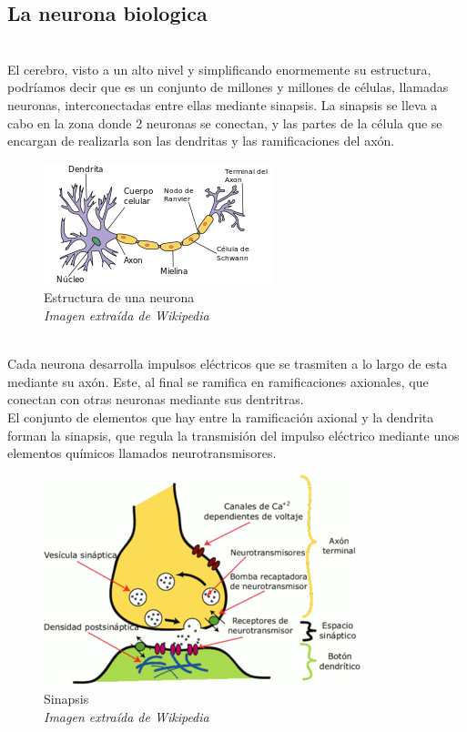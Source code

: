 \subsection {La neurona biologica} \mbox{}\\
El cerebro, visto a un alto nivel y simplificando enormemente su estructura, podríamos decir que es un conjunto de millones y millones de células, llamadas neuronas, interconectadas entre ellas mediante sinapsis. La sinapsis se lleva a cabo en la zona donde 2 neuronas se conectan, y las partes de la célula que se encargan de realizarla son las dendritas y las ramificaciones del axón.
\begin{figure}[htp]
\centering
\includegraphics[scale=1]{images/neurona.png}
\caption{Estructura de una neurona\\\textit{Imagen extraída de Wikipedia}}
\end{figure}\\
Cada neurona desarrolla impulsos eléctricos que se trasmiten a lo largo de esta mediante su axón. Este, al final se ramifica en ramificaciones axionales, que conectan con otras neuronas mediante sus dentritras.\\
El conjunto de elementos que hay entre la ramificación axional y la dendrita forman la sinapsis, que regula la transmisión del impulso eléctrico mediante unos elementos químicos llamados neurotransmisores.
\begin{figure}[htp]
\centering
\includegraphics[scale=0.70]{images/sinapsis.png}
\caption{Sinapsis\\\textit{Imagen extraída de Wikipedia}}
\end{figure}\\
